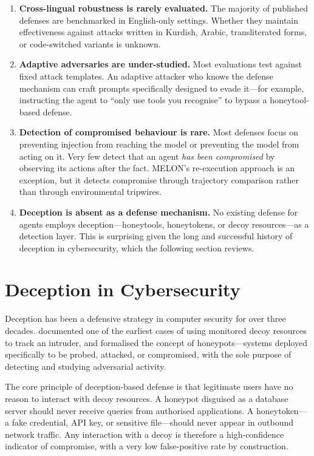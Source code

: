 \begin{enumerate}[nosep]
  \item \textbf{Cross-lingual robustness is rarely evaluated.}  The majority of published defenses are benchmarked in English-only settings.  Whether they maintain effectiveness against attacks written in Kurdish, Arabic, transliterated forms, or code-switched variants is unknown.
  \item \textbf{Adaptive adversaries are under-studied.}  Most evaluations test against fixed attack templates.  An adaptive attacker who knows the defense mechanism can craft prompts specifically designed to evade it---for example, instructing the agent to ``only use tools you recognise'' to bypass a honeytool-based defense.
  \item \textbf{Detection of compromised behaviour is rare.}  Most defenses focus on preventing injection from reaching the model or preventing the model from acting on it.  Very few detect that an agent \emph{has been compromised} by observing its actions after the fact.  MELON's re-execution approach is an exception, but it detects compromise through trajectory comparison rather than through environmental tripwires.
  \item \textbf{Deception is absent as a defense mechanism.}  No existing defense for agents employs deception---honeytools, honeytokens, or decoy resources---as a detection layer.  This is surprising given the long and successful history of deception in cybersecurity, which the following section reviews.
\end{enumerate}


\section{Deception in Cybersecurity}
\label{sec:deception_cyber}

Deception has been a defensive strategy in computer security for over three decades.  \textcite{stoll1989cuckoo} documented one of the earliest cases of using monitored decoy resources to track an intruder, and \textcite{spitzner2003honeypots} formalised the concept of honeypots---systems deployed specifically to be probed, attacked, or compromised, with the sole purpose of detecting and studying adversarial activity.

The core principle of deception-based defense is that legitimate users have no reason to interact with decoy resources.  A honeypot disguised as a database server should never receive queries from authorised applications.  A honeytoken---a fake credential, API key, or sensitive file---should never appear in outbound network traffic.  Any interaction with a decoy is therefore a high-confidence indicator of compromise, with a very low false-positive rate by construction.

